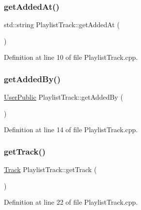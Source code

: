 \subsubsection{\texorpdfstring{get\+Added\+At()}{getAddedAt()}}
{\footnotesize\ttfamily std\+::string Playlist\+Track\+::get\+Added\+At (\begin{DoxyParamCaption}{ }\end{DoxyParamCaption})}



Definition at line 10 of file Playlist\+Track.\+cpp.

\mbox{\label{class_playlist_track_a5bf0fcdb947eb2b4ae8497ffa8f4d96a}} 
\subsubsection{\texorpdfstring{get\+Added\+By()}{getAddedBy()}}
{\footnotesize\ttfamily \mbox{\hyperlink{class_user_public}{User\+Public}} Playlist\+Track\+::get\+Added\+By (\begin{DoxyParamCaption}{ }\end{DoxyParamCaption})}



Definition at line 14 of file Playlist\+Track.\+cpp.

\mbox{\label{class_playlist_track_a8f3876cbee0c4757c9d17952447ad7c9}} 
\subsubsection{\texorpdfstring{get\+Track()}{getTrack()}}
{\footnotesize\ttfamily \mbox{\hyperlink{class_track}{Track}} Playlist\+Track\+::get\+Track (\begin{DoxyParamCaption}{ }\end{DoxyParamCaption})}



Definition at line 22 of file Playlist\+Track.\+cpp.

\mbox{\label{class_playlist_track_a5cc73ec3bc42d9c310c0ee91a154f67b}} 
